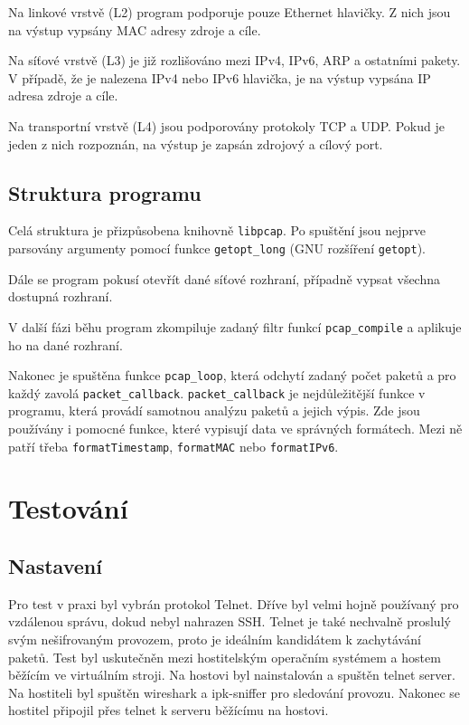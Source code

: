 \documentclass[12pt,a4paper]{article}
\begin{document}
Na linkové vrstvě (L2) program podporuje pouze Ethernet hlavičky.
Z nich jsou na výstup vypsány MAC adresy zdroje a cíle.


Na síťové vrstvě (L3) je již rozlišováno mezi IPv4, IPv6, ARP a ostatními pakety.
V případě, že je nalezena IPv4 nebo IPv6 hlavička, je na výstup vypsána IP adresa zdroje a cíle.

Na transportní vrstvě (L4) jsou podporovány protokoly TCP a UDP.
Pokud je jeden z nich rozpoznán, na výstup je zapsán zdrojový a cílový port.

\subsection{Struktura programu}
Celá struktura je přizpůsobena knihovně \texttt{libpcap}.
Po spuštění jsou nejprve parsovány argumenty pomocí funkce \texttt{getopt\_long} (GNU rozšíření \texttt{getopt}).

Dále se program pokusí otevřít dané síťové rozhraní, případně vypsat všechna dostupná rozhraní.

V další fázi běhu program zkompiluje zadaný filtr funkcí \texttt{pcap\_compile} a aplikuje ho na dané rozhraní.

Nakonec je spuštěna funkce \texttt{pcap\_loop}, která odchytí zadaný počet paketů a pro každý zavolá \texttt{packet\_callback}.
\texttt{packet\_callback} je nejdůležitější funkce v programu, která provádí samotnou analýzu paketů a jejich výpis.
Zde jsou používány i pomocné funkce, které vypisují data ve správných formátech.
Mezi ně patří třeba \texttt{formatTimestamp}, \texttt{formatMAC} nebo \texttt{formatIPv6}.
\newpage

\section{Testování}
\subsection{Nastavení}
Pro test v praxi byl vybrán protokol Telnet.
Dříve byl velmi hojně používaný pro vzdálenou správu, dokud nebyl nahrazen SSH.
Telnet je také nechvalně proslulý svým nešifrovaným provozem, proto je ideálním kandidátem k zachytávání paketů.
Test byl uskutečněn mezi hostitelským operačním systémem a hostem běžícím ve virtuálním stroji.
Na hostovi byl nainstalován a spuštěn telnet server.
Na hostiteli byl spuštěn wireshark a ipk-sniffer pro sledování provozu.
Nakonec se hostitel připojil přes telnet k serveru běžícímu na hostovi.
\end{document}
